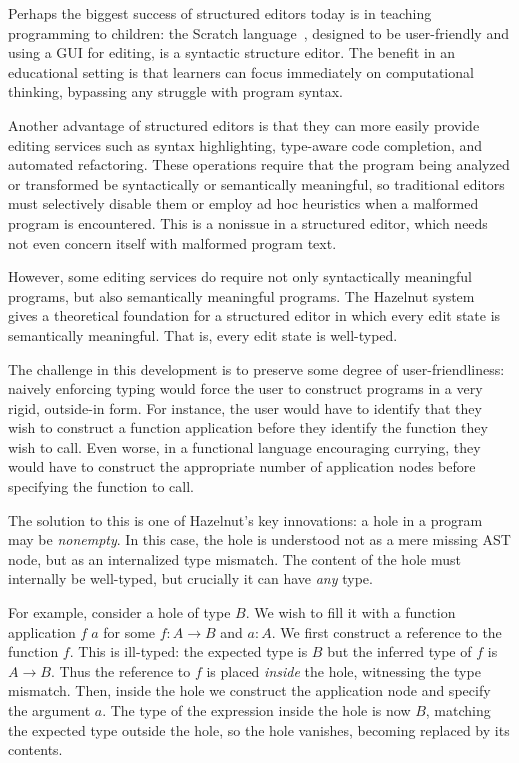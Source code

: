 Perhaps the biggest success of structured editors today is in teaching
programming to children: the Scratch language~\cite{scratch}, designed to be
user-friendly and using a GUI for editing, is a syntactic structure editor.
The benefit in an educational setting is that learners can focus immediately on
computational thinking, bypassing any struggle with program syntax.

Another advantage of structured editors is that they can more easily provide
editing services such as syntax highlighting, type-aware code completion, and
automated refactoring.
These operations require that the program being analyzed or transformed be
syntactically or semantically meaningful, so traditional editors must
selectively disable them or employ ad hoc heuristics when a malformed program is
encountered.
This is a nonissue in a structured editor, which needs not even concern itself
with malformed program text.

However, some editing services do require not only syntactically meaningful
programs, but also semantically meaningful programs.
The Hazelnut system~\cite{hazelnut} gives a theoretical foundation for a
structured editor in which every edit state is semantically meaningful.
That is, every edit state is well-typed.

The challenge in this development is to preserve some degree of
user-friendliness: naively enforcing typing would force the user to construct
programs in a very rigid, outside-in form.
For instance, the user would have to identify that they wish to construct a
function application before they identify the function they wish to
call.
Even worse, in a functional language encouraging currying, they would have to
construct the appropriate number of application nodes before specifying the
function to call.

The solution to this is one of Hazelnut's key innovations:
a hole in a program may be \emph{nonempty}.
In this case, the hole is understood not as a mere missing AST node, but as an
internalized type mismatch.
The content of the hole must internally be well-typed, but crucially it can have
\emph{any} type.

For example, consider a hole of type $B$. We wish to fill it with a function
application $f\;a$ for some $f : A \to B$ and $a : A$.
We first construct a reference to the function $f$.
This is ill-typed: the expected type is $B$ but the inferred type of $f$ is $A
\to B$.
Thus the reference to $f$ is placed \emph{inside} the hole, witnessing the type
mismatch.
Then, inside the hole we construct the application node and specify the argument
$a$.
The type of the expression inside the hole is now $B$, matching the expected
type outside the hole, so the hole vanishes, becoming replaced by its contents.

